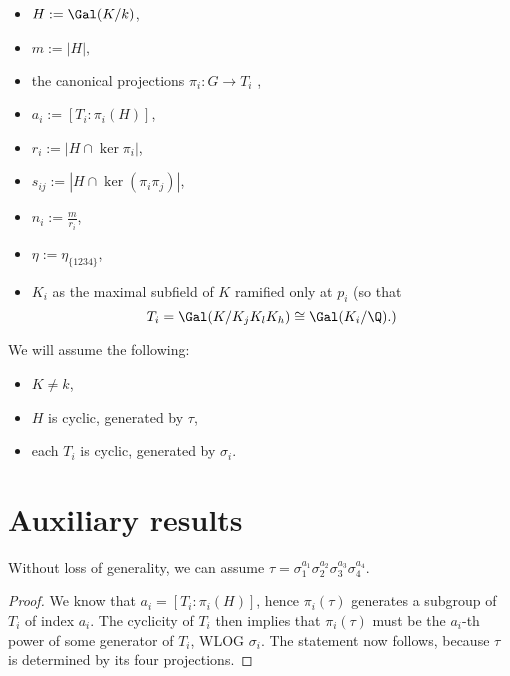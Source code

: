 \begin{itemize}
\item $H:=\Gal(K/k)$, 
\item $m:=|H|,$
\item the canonical projections $\pi_i:G\to T_i$ ,
\item $a_i:=[T_i:\pi_i(H)]$,
\item $r_i:=|H\cap \ker \pi_i|$,
\item $s_{ij}:=|H\cap \ker (\pi_i\pi_j)|$,
\item $n_i:=\frac{m}{r_i}$,
\item $\eta:=\eta_{\{1234\}}$,
\item $K_i$ as the maximal subfield of $K$ ramified only at $p_i$ (so that $$T_i=\Gal(K/K_jK_lK_h)\cong \Gal(K_i/\Q).)$$
\end{itemize}

We will assume the following: \label{assum}
\begin{itemize}
\item $K\neq k$,
\item $H$ is cyclic, generated by $\tau$,
\item each $T_i$ is cyclic, generated by $\sigma_i$.
\end{itemize}

\section{Auxiliary results}
\begin{lemma}\label{tau}
Without loss of generality, we can assume $\tau=\sigma_1^{a_1}\sigma_2^{a_2}\sigma_3^{a_3}\sigma_4^{a_4}$.
\end{lemma}
\begin{proof}
We know that $a_i=[T_i:\pi_i(H)]$, hence
$\pi_i(\tau)$ generates a subgroup of $T_i$ of index $a_i$. The cyclicity of $T_i$ then implies that $\pi_i(\tau)$ must be the $a_i$-th power of some generator of $T_i$, WLOG $\sigma_i$. The statement now follows, because $\tau$ is determined by its four projections.
\end{proof}

